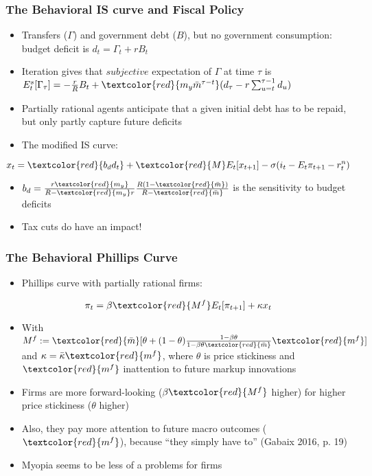 \documentclass{beamer}
\begin{document}
\begin{frame}
\frametitle{The Behavioral IS curve and Fiscal Policy}
\begin{itemize}
\item Transfers ($\Gamma$) and government debt ($B$), but no government consumption: budget deficit is $d_ {t}=\Gamma_{t}+rB_{t}$
\item Iteration gives that $subjective$ expectation of $\Gamma$ at time $\tau$ is $E_{t}^{s}[\Gamma_{\tau}]=-\frac {r}{R}B_{t}+\textcolor{red}{m_{y}\bar m^{\tau-t}}(d_{\tau}-r \sum_{u=t}^{\tau-1}d_{u})$
\item Partially rational agents anticipate that a given initial debt has to be repaid, but only partly capture future deficits
\item The modified IS curve:

\end{itemize}
	$$x_{t}=\textcolor{red}{b_{d}d_{t}}+\textcolor{red}{M}E_{t}[x_{t+1}]-\sigma(i_{t}-E_{t}\pi_{t+1}-r_{t}^{n})$$
\begin{itemize}
 \item $b_{d}=\frac {r\textcolor{red}{m_{y}}}{R-\textcolor{red}{m_{y}}r}\frac {R(1-\textcolor{red}{\bar m})}{R-\textcolor{red}{\bar m}}$ is the sensitivity to budget deficits
 \item Tax cuts do have an impact!
\end{itemize}
\end{frame}


\begin{frame}
\frametitle{The Behavioral Phillips Curve}
\begin{itemize}
\item Phillips curve with partially rational firms:
\end{itemize}
	$$\pi_{t}=\beta \textcolor{red}{M^{f}}E_{t}[\pi_{t+1}]+\kappa x_{t}$$
\begin{itemize}
\item With $M^{f}:=\textcolor{red}{\bar m}[\theta+(1-\theta)\frac{1-\beta \theta}{1-\beta \theta \textcolor{red}{\bar m}}\textcolor{red}{m^{f}}]$ and $\kappa=\bar \kappa \textcolor{red}{m^{f}}$, where $\theta$ is price stickiness and $\textcolor{red}{m^{f}}$ inattention to future markup innovations
\item Firms are more forward-looking ($\beta \textcolor{red}{ M^{f}}$ higher) for higher price stickiness ($\theta$ higher) 
\item Also, they pay more attention to future macro outcomes ($\textcolor{red}{m^{f}}$),  because ``they simply have to'' (Gabaix 2016, p. 19)
\item Myopia seems to be less of a problems for firms
\end{itemize}
\end{frame}
\end{document}
